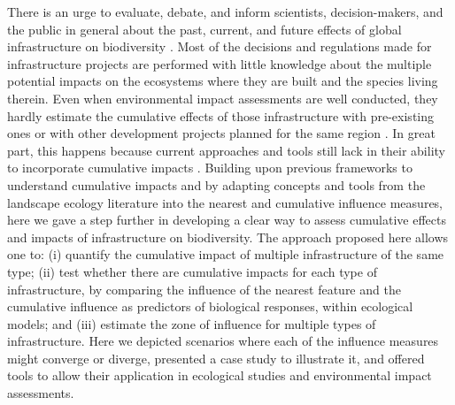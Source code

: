 \documentclass[titlepage]{article}
\begin{document}
There is an urge to evaluate, debate, and inform scientists, decision-makers, and the public in general about the past, current, and future effects of global infrastructure on biodiversity \citep{laurance_conservation_2018}. Most of the decisions and regulations made for infrastructure projects are performed with little knowledge about the multiple potential impacts on the ecosystems where they are built and the species living therein. Even when environmental impact assessments are well conducted, they hardly estimate the cumulative effects of those infrastructure with pre-existing ones or with other development projects planned for the same region \citep{laurance_roads_2017, krausman_cumulative_2011}. In great part, this happens because current approaches and tools still lack in their ability to incorporate cumulative impacts \citep[but see][for recent advances]{gillingham_integration_2016}. Building upon previous frameworks to understand cumulative impacts \citep{naugle_unifying_2011} and by adapting concepts and tools from the landscape ecology literature into the nearest and cumulative influence measures, here we gave a step further in developing a clear way to assess cumulative effects and impacts of infrastructure on biodiversity. The approach proposed here allows one to: (i) quantify the cumulative impact of multiple infrastructure of the same type; (ii) test whether there are cumulative impacts for each type of infrastructure, by comparing the influence of the nearest feature and the cumulative influence as predictors of biological responses, within ecological models; and (iii) estimate the zone 
of influence for multiple types of infrastructure. Here we depicted scenarios where each of the influence measures might converge or diverge, presented a case study to illustrate it, and offered tools to allow their application in ecological studies and environmental impact assessments.
\end{document}
